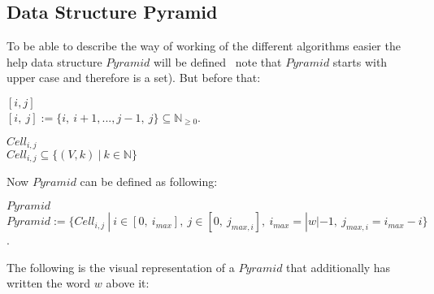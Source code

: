 \subsection{Data Structure Pyramid}
To be able to describe the way of working of the different algorithms easier the help data structure $Pyramid$ will be defined \textendash~note that $Pyramid$ starts with upper case and therefore is a set). But before that:
\begin{DefGrey} \textbf{$[i, j]$} \\
	$[i,\ j] := \{i,\ i+1,..., j-1,\ j\} \subseteq \mathbb{N}_{\geq 0}$.
\end{DefGrey}

\begin{DefGrey} \textbf{$Cell_{i,j}$} \\
	$Cell_{i,j} \subseteq \{(V,k)~|~k \in \mathbb{N} \}$
\end{DefGrey}
\noindent Now $Pyramid$ can be defined as following:
\begin{DefGrey} \textbf{$Pyramid$} \\
	$Pyramid :=\{ Cell_{i,j}\ |\ i \in [0,\ i_{max}],\  j \in [0,\ j_{max,i}],\ i_{max} = |w|-1,~j_{max,i} = i_{max} -i\}$.
\end{DefGrey}
\noindent The following is the visual representation of a $Pyramid$ that additionally has written the word $w$ above it:
\newcommand{\boxpyramid}[1]{
	\fontsize{5}{12}\selectfont{#1}
}
